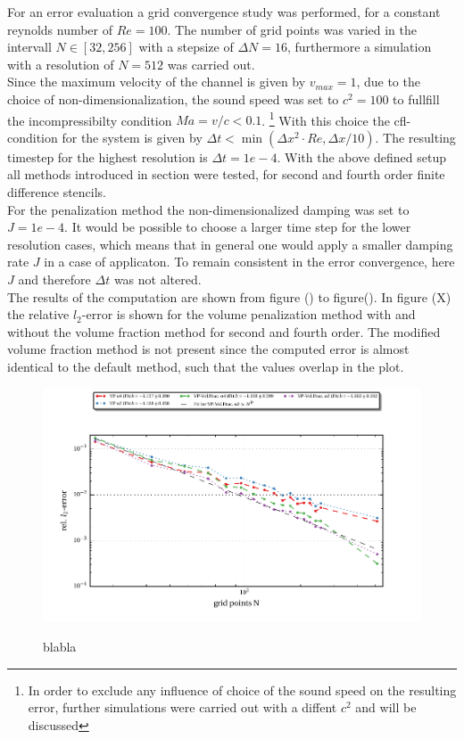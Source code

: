 For an error evaluation a grid convergence study was performed, for a constant reynolds number of $Re=100$.
The number of grid points was varied in the intervall $N\in[32, 256]$ with a stepsize of $\Delta N = 16$, furthermore a
simulation with a resolution of $N=512$ was carried out.\\
Since the maximum velocity of the channel is given by $v_{max}=1$, due to the choice of non-dimensionalization,
the sound speed was set to $c^2 = 100$ to fullfill the incompressibilty condition $Ma = v/c < 0.1$. \footnote{In order to exclude
any influence of choice of the sound speed on the resulting error, further simulations were carried out with a diffent $c^2$ and will be discussed}
With this choice the cfl-condition for the system is given by $\Delta t < \min(\Delta x^2 \cdot Re, \Delta x / 10)$.
The resulting timestep for the highest resolution is $\Delta t = 1e-4$.
With the above defined setup all methods introduced in section were tested, for second and fourth order finite difference stencils.\\
For the penalization method the non-dimensionalized damping was set to $J=1e-4$.
It would be possible to choose a larger time step for the lower resolution cases, which means that in general
one would apply a smaller damping rate $J$ in a case of applicaton. To remain consistent in the error convergence, here $J$ and
therefore $\Delta t$ was not altered.\\
The results of the computation are shown from figure () to figure().
In figure (X) the relative $l_2$-error is shown for the volume penalization method with and without the volume fraction method
for second and fourth order. The modified volume fraction method is not present since the computed error is almost identical to the default method,
such that the values overlap in the plot.

\begin{figure}[!pt]
  \centering
  \includegraphics{gfx/immersed_boundary/hpflow/theo/vp.pdf}\label{fig:hpflow_vpgc_theo}
  \caption{blabla}
\end{figure}

